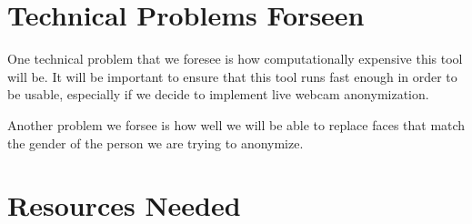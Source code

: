 \section*{Technical Problems Forseen}

One technical problem that we foresee is how computationally expensive this tool will be. It will be important to ensure that this tool runs fast enough in order to be usable, especially if we decide to implement live webcam anonymization.

Another problem we forsee is how well we will be able to replace faces that match the gender of the person we are trying to anonymize.

\section*{Resources Needed}


